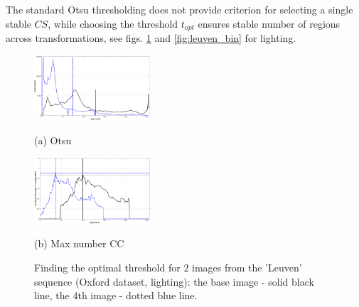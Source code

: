 \documentclass{article}
\begin{document}
The standard Otsu thresholding does not provide criterion for selecting a single stable $CS$, while choosing the threshold $t_{opt}$ ensures stable number of regions across transformations, see figs. \ref{fig:binary_hist} and \ref{fig:leuven_bin} for lighting.
\begin{figure}[htb]

\begin{minipage}[b]{0.49\linewidth}
  \centering
  \centerline{\includegraphics[width=4.3cm]{./Figs/hist_otsu_leuven_1_4}}
  \centerline{(a) Otsu}\medskip
\end{minipage}
\hfill
\begin{minipage}[b]{0.49\linewidth}
  \centering
  \centerline{\includegraphics[width=4.3cm]{./Figs/hist_numcc_leuven_1_4}}
\centerline{(b) Max number CC}\medskip
\end{minipage}
\hfill
\vspace{-0.5cm}
\caption{Finding the optimal threshold for $2$ images from the 'Leuven' sequence 
(Oxford dataset, lighting): the base image - solid black line, the 4th image - dotted blue line.}
\label{fig:binary_hist}
%
\end{figure}
\end{document}
